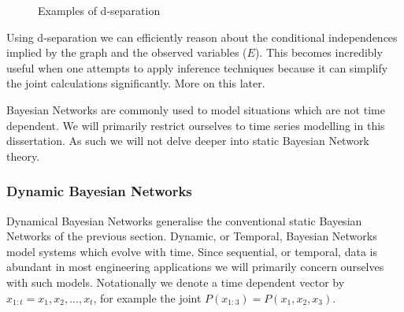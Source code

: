\begin{figure}[H] 
\centering
{}
\caption{Examples of d-separation}
\label{fig_dsep}
\end{figure}
Using d-separation we can efficiently reason about the conditional independences implied by the graph and the observed variables ($E$). This becomes incredibly useful when one attempts to apply inference techniques because it can simplify the joint calculations significantly. More on this later.

Bayesian Networks are commonly used to model situations which are not time dependent. We will primarily restrict ourselves to time series modelling in this dissertation. As such we will not delve deeper into static Bayesian Network theory.

\subsubsection{Dynamic Bayesian Networks}
Dynamical Bayesian Networks generalise the conventional static Bayesian Networks of the previous section. Dynamic, or Temporal, Bayesian Networks model systems which evolve with time. Since sequential, or temporal, data is abundant in most engineering applications we will primarily concern ourselves with such models. Notationally we denote a time dependent vector by $x_{1:t}=x_1,x_2,...,x_t$, for example the joint $P(x_{1:3})=P(x_1,x_2,x_3)$.

